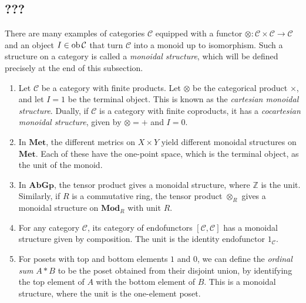 \subsection{???}
There are many examples of categories \( \mathcal C \) equipped with a functor \( \otimes : \mathcal C \times \mathcal C \to \mathcal C \) and an object \( I \in \operatorname{ob} \mathcal C \) that turn \( \mathcal C \) into a monoid up to isomorphism.
Such a structure on a category is called a \emph{monoidal structure}, which will be defined precisely at the end of this subsection.
\begin{example}
    \begin{enumerate}
        \item Let \( \mathcal C \) be a category with finite products.
        Let \( \otimes \) be the categorical product \( \times \), and let \( I = 1 \) be the terminal object.
        This is known as the \emph{cartesian monoidal structure}.
        Dually, if \( \mathcal C \) is a category with finite coproducts, it has a \emph{cocartesian monoidal structure}, given by \( \otimes = + \) and \( I = 0 \).
        \item In \( \mathbf{Met} \), the different metrics on \( X \times Y \) yield different monoidal structures on \( \mathbf{Met} \).
        Each of these have the one-point space, which is the terminal object, as the unit of the monoid.
        \item In \( \mathbf{AbGp} \), the tensor product gives a monoidal structure, where \( \mathbb Z \) is the unit.
        Similarly, if \( R \) is a commutative ring, the tensor product \( \otimes_R \) gives a monoidal structure on \( \mathbf{Mod}_R \) with unit \( R \).
        \item For any category \( \mathcal C \), its category of endofunctors \( [\mathcal C, \mathcal C] \) has a monoidal structure given by composition.
        The unit is the identity endofunctor \( 1_{\mathcal C} \).
        \item For posets with top and bottom elements \( 1 \) and \( 0 \), we can define the \emph{ordinal sum} \( A \ast B \) to be the poset obtained from their disjoint union, by identifying the top element of \( A \) with the bottom element of \( B \).
        This is a monoidal structure, where the unit is the one-element poset.
    \end{enumerate}
\end{example}

